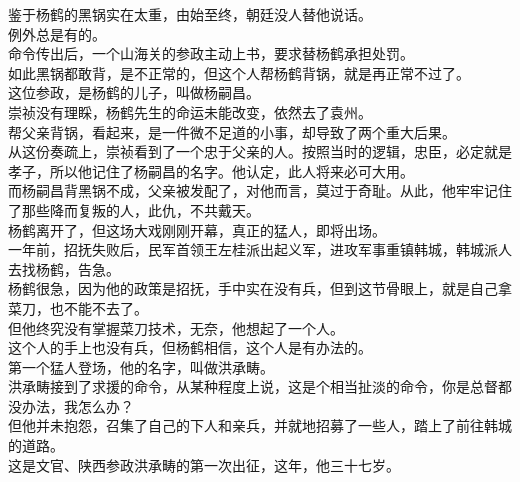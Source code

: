 \begin{multicols}{\theparacolNo}
鉴于杨鹤的黑锅实在太重，由始至终，朝廷没人替他说话。\\

例外总是有的。\\

命令传出后，一个山海关的参政主动上书，要求替杨鹤承担处罚。\\

如此黑锅都敢背，是不正常的，但这个人帮杨鹤背锅，就是再正常不过了。\\

这位参政，是杨鹤的儿子，叫做杨嗣昌。\\

崇祯没有理睬，杨鹤先生的命运未能改变，依然去了袁州。\\

帮父亲背锅，看起来，是一件微不足道的小事，却导致了两个重大后果。\\

从这份奏疏上，崇祯看到了一个忠于父亲的人。按照当时的逻辑，忠臣，必定就是孝子，所以他记住了杨嗣昌的名字。他认定，此人将来必可大用。\\

而杨嗣昌背黑锅不成，父亲被发配了，对他而言，莫过于奇耻。从此，他牢牢记住了那些降而复叛的人，此仇，不共戴天。\\

杨鹤离开了，但这场大戏刚刚开幕，真正的猛人，即将出场。\\

一年前，招抚失败后，民军首领王左桂派出起义军，进攻军事重镇韩城，韩城派人去找杨鹤，告急。\\

杨鹤很急，因为他的政策是招抚，手中实在没有兵，但到这节骨眼上，就是自己拿菜刀，也不能不去了。\\

但他终究没有掌握菜刀技术，无奈，他想起了一个人。\\

这个人的手上也没有兵，但杨鹤相信，这个人是有办法的。\\

第一个猛人登场，他的名字，叫做洪承畴。\\

洪承畴接到了求援的命令，从某种程度上说，这是个相当扯淡的命令，你是总督都没办法，我怎么办？\\

但他并未抱怨，召集了自己的下人和亲兵，并就地招募了一些人，踏上了前往韩城的道路。\\

这是文官、陕西参政洪承畴的第一次出征，这年，他三十七岁。\\


\end{multicols}
